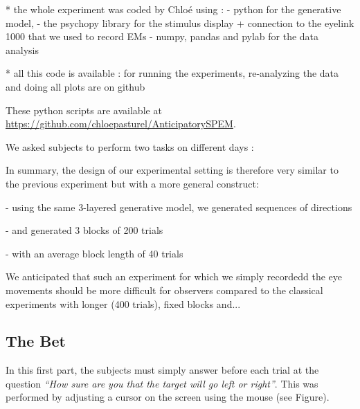 \documentclass[profile,final,english, draft]{article}%
\begin{document}
 * the whole experiment was coded by Chloé using :
 - python for the generative model,
 - the psychopy library for the stimulus display + connection to the eyelink 1000 that we used to record EMs
 - numpy, pandas and pylab for the data analysis

  * all this code is available : for running the experiments, re-analyzing the data and doing all plots are on github

These python scripts are available at \url{https://github.com/chloepasturel/AnticipatorySPEM}.


We asked subjects to perform two tasks on different days :

In summary, the design of our experimental setting is therefore very similar to the previous experiment but with a more general construct:

- using the same 3-layered generative model, we generated sequences of directions

- and generated 3 blocks of 200 trials

- with an average block length of 40 trials

We anticipated that such an  experiment for which we simply recordedd the eye movements should be more difficult for observers compared to the classical experiments with longer (400 trials), fixed blocks and...

\subsection{The Bet}
In this first part, the subjects must simply answer before each trial at the question \textit{ ``How sure are you that the target will go left or right''}. This was performed by adjusting a cursor on the screen using the mouse (see Figure).

\end{document}
